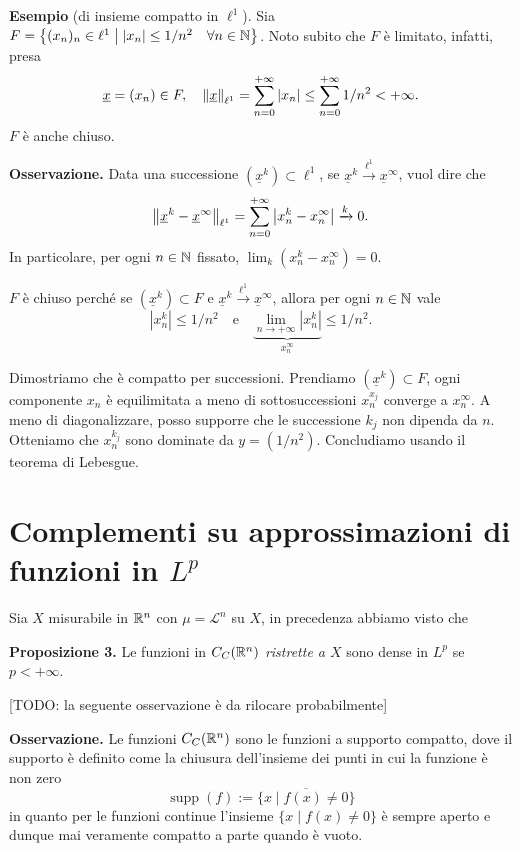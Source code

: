 \documentclass[a4paper, 12pt]{report}
\begin{document}
\textbf{Esempio} (di insieme compatto in $\ell^1$). Sia $F = \left\{ (x_n)_n \in \ell^1 \;\middle|\; \left| x_n \right| \leq 1 / n^2 \quad \forall n \in \mathbb N \right\}$.
Noto subito che $F$ è limitato, infatti, presa
%
$$
\underline{x} = (x_n) \in F, \quad  \left\lVert \underline{x} \right\rVert_{\ell^1} = \sum_{n=0}^{+\infty} \left| x_n \right| \leq
\sum_{n=0}^{+\infty} 1 / n^2 < +\infty.  
$$
%
$F$ è anche chiuso.

\textbf{Osservazione.} Data una successione $(\underline{x}^k) \subset \ell^1$, se $\underline{x}^k \xrightarrow{\ell^1} \underline{x}^{\infty}$, vuol dire che
%
$$
\left\lVert \underline{x}^k - \underline{x}^\infty \right\rVert_{\ell^1} = \sum_{n = 0}^{+\infty}  \left| x_n^k - x_n^\infty \right| \xrightarrow{k} 0. 
$$
%
In particolare, per ogni $n \in \mathbb N$ fissato, $\lim_k (x_n^k - x_n^\infty) = 0$.

$F$ è chiuso perché se $(\underline{x}^k) \subset F$ e $\underline{x}^k \xrightarrow{\ell^1} \underline{x}^\infty$, allora per ogni $n \in \mathbb N$ vale 
%
$$
\left| x_n^k \right| \leq 1 / n^2 \quad \text{e} \quad \underbrace{\lim_{n \to +\infty} \left| x_n^k  \right|}_{x_n^\infty} \leq 1/n^2.
$$
%

Dimostriamo che è compatto per successioni.
Prendiamo $( \underline{x}^k ) \subset F$, ogni componente $x_n$ è equilimitata a meno di sottosuccessioni $x_n^{x_j}$ converge a $x_n^\infty$.
A meno di diagonalizzare, posso supporre che le successione $k_j$ non dipenda da $n$.
Otteniamo che $x_n^{k_j}$ sono dominate da $y = (1 / n^2)$. Concludiamo usando il teorema di Lebesgue.

% 
% 

\section{Complementi su approssimazioni di funzioni in $L^p$}

Sia $X$ misurabile in $\mathbb R^n$ con $\mu = \mathscr L^n$ su $X$, in precedenza abbiamo visto che

\textbf{Proposizione 3.} Le funzioni in $C_C(\mathbb R^n)$ \textit{ristrette a $X$} sono dense in $L^p$ se $p < +\infty$.

[TODO: la seguente osservazione è da rilocare probabilmente]

\textbf{Osservazione.} 
Le funzioni $C_C(\mathbb R^n)$ sono le funzioni a supporto compatto, dove il supporto è definito come la chiusura dell'insieme dei punti in cui la funzione è non zero
$$
\operatorname{supp}(f) := \overline{\{ x \mid f(x) \neq 0 \}}
$$
in quanto per le funzioni continue l'insieme $\{ x \mid f(x) \neq 0 \}$ è sempre aperto e dunque mai veramente compatto a parte quando è vuoto.
\end{document}
